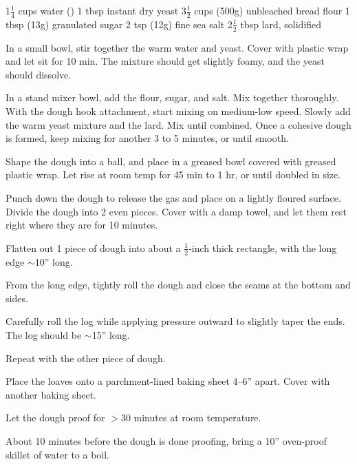 \dishtype{\bread}
\dishother{\vegetarian}
\begin{ingreds}
    1$\frac{1}{4}$ cups water ()
    1 tbsp instant dry yeast
    3$\frac{1}{2}$ cups (500g) unbleached bread flour
    1 tbsp (13g) granulated sugar
    2 tsp (12g) fine sea salt
    2$\frac{1}{2}$ tbsp lard, solidified
\end{ingreds}
\begin{method}
    In a small bowl, stir together the warm water and yeast. Cover with plastic wrap and let sit for 10 min. The mixture should get slightly foamy, and the yeast should dissolve.\par
    In a stand mixer bowl, add the flour, sugar, and salt. Mix together thoroughly. With the dough hook attachment, start mixing on medium-low speed. Slowly add the warm yeast mixture and the lard. Mix until combined. Once a cohesive dough is formed, keep mixing for another 3 to 5 minutes, or until smooth.\par
    Shape the dough into a ball, and place in a greased bowl covered with greased plastic wrap. Let rise at room temp for 45 min to 1 hr, or until doubled in size.\par
    Punch down the dough to release the gas and place on a lightly floured surface. Divide the dough into 2 even pieces. Cover with a damp towel, and let them rest right where they are for 10 minutes.\par
    Flatten out 1 piece of dough into about a $\frac{1}{2}$-inch thick rectangle, with the long edge $\sim$10'' long.\par
    From the long edge, tightly roll the dough and close the seams at the bottom and sides.\par
    Carefully roll the log while applying pressure outward to \linebreak slightly taper the ends. The log should be $\sim$15'' long.\par
    Repeat with the other piece of dough.\par
    Place the loaves onto a parchment-lined baking sheet 4--6'' apart. Cover with another baking sheet.\par
    Let the dough proof for $>$30 minutes at room temperature.\par
    About 10 minutes before the dough is done proofing, bring a 10'' oven-proof skillet of water to a boil.\par

\end{method}
